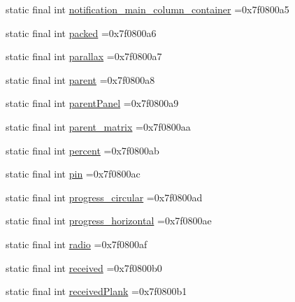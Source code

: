 \begin{DoxyCompactItemize}
static final int \mbox{\hyperlink{classcom_1_1example_1_1trainawearapplication_1_1_r_1_1id_a61a17f2a2f8d156212cc77cd4dee23ee}{notification\+\_\+main\+\_\+column\+\_\+container}} =0x7f0800a5
\item 
static final int \mbox{\hyperlink{classcom_1_1example_1_1trainawearapplication_1_1_r_1_1id_a163dd0e82d432ae754774215c44a2eed}{packed}} =0x7f0800a6
\item 
static final int \mbox{\hyperlink{classcom_1_1example_1_1trainawearapplication_1_1_r_1_1id_a82c5740b80947fbea59d18192f56de7a}{parallax}} =0x7f0800a7
\item 
static final int \mbox{\hyperlink{classcom_1_1example_1_1trainawearapplication_1_1_r_1_1id_a421d3312bb32cd36ad2e7abdd3e62700}{parent}} =0x7f0800a8
\item 
static final int \mbox{\hyperlink{classcom_1_1example_1_1trainawearapplication_1_1_r_1_1id_a12e2c4e7ebf72f28fd73722e59d1e01e}{parent\+Panel}} =0x7f0800a9
\item 
static final int \mbox{\hyperlink{classcom_1_1example_1_1trainawearapplication_1_1_r_1_1id_a335b7b2456cbf4329c850d8d92aae061}{parent\+\_\+matrix}} =0x7f0800aa
\item 
static final int \mbox{\hyperlink{classcom_1_1example_1_1trainawearapplication_1_1_r_1_1id_ab3eefef7ec029c22b80fdbf8ebb134ff}{percent}} =0x7f0800ab
\item 
static final int \mbox{\hyperlink{classcom_1_1example_1_1trainawearapplication_1_1_r_1_1id_abec0e674cf2ec849645147c2c573aade}{pin}} =0x7f0800ac
\item 
static final int \mbox{\hyperlink{classcom_1_1example_1_1trainawearapplication_1_1_r_1_1id_a086345a2f50e9c945083f7196396f225}{progress\+\_\+circular}} =0x7f0800ad
\item 
static final int \mbox{\hyperlink{classcom_1_1example_1_1trainawearapplication_1_1_r_1_1id_a6129f9516a633c0e9b4a25ae2a3b2681}{progress\+\_\+horizontal}} =0x7f0800ae
\item 
static final int \mbox{\hyperlink{classcom_1_1example_1_1trainawearapplication_1_1_r_1_1id_af4db8d6df1420553b21897e2ff863012}{radio}} =0x7f0800af
\item 
static final int \mbox{\hyperlink{classcom_1_1example_1_1trainawearapplication_1_1_r_1_1id_abde9cf658a452d88d13561ee362531fc}{received}} =0x7f0800b0
\item 
static final int \mbox{\hyperlink{classcom_1_1example_1_1trainawearapplication_1_1_r_1_1id_a75f277a82ec05249c5f721f1e2224f7d}{received\+Plank}} =0x7f0800b1
\item 

\end{DoxyCompactItemize}
